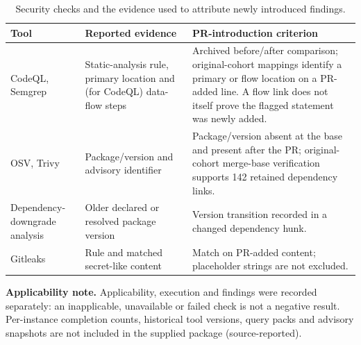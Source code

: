 
\begin{table}[H]
\caption{Security checks and the evidence used to attribute newly introduced findings.}
\label{tab:scanners}
\footnotesize\renewcommand{\arraystretch}{1.13}
\begin{tabularx}{\linewidth}{@{}L{2.5cm}L{3.25cm}Y@{}}
\toprule
\textbf{Tool} & \textbf{Reported evidence} & \textbf{PR-introduction criterion}\\
\midrule
CodeQL, Semgrep & Static-analysis rule, primary location and (for CodeQL) data-flow steps & Archived before/after comparison; original-cohort mappings identify a primary or flow location on a PR-added line. A flow link does not itself prove the flagged statement was newly added.\\
OSV, Trivy & Package/version and advisory identifier & Package/version absent at the base and present after the PR; original-cohort merge-base verification supports 142 retained dependency links.\\
Dependency-downgrade analysis & Older declared or resolved package version & Version transition recorded in a changed dependency hunk.\\
Gitleaks & Rule and matched secret-like content & Match on PR-added content; placeholder strings are not excluded.\\
\bottomrule
\end{tabularx}
\par\smallskip\raggedright\scriptsize
\textbf{Applicability note.} Applicability, execution and findings were recorded separately: an inapplicable, unavailable or failed check is not a negative result. Per-instance completion counts, historical tool versions, query packs and advisory snapshots are not included in the supplied package (source-reported).
\end{table}

